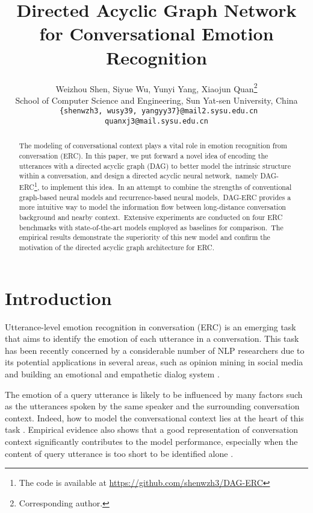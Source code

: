 \documentclass[11pt,a4paper]{article}
\title{Directed Acyclic Graph Network for Conversational Emotion Recognition}
\author{Weizhou Shen,  Siyue Wu,  Yunyi Yang, Xiaojun Quan\thanks{\; Corresponding author.} \\
  School of Computer Science and Engineering, Sun Yat-sen University, China \\
  \texttt{ \{shenwzh3, wusy39, yangyy37\}@mail2.sysu.edu.cn}\\
  \texttt{quanxj3@mail.sysu.edu.cn}}
\date{}
\begin{document}
\maketitle
\begin{abstract}
The modeling of conversational context plays a vital role in emotion recognition from conversation (ERC). In this paper, we put forward a novel idea of encoding the utterances with a directed acyclic graph (DAG) to better model the intrinsic structure within a conversation, and design a directed acyclic neural network,~namely DAG-ERC\footnote{The code is available at \url{https://github.com/shenwzh3/DAG-ERC}}, to implement this idea.~In an attempt to combine the strengths of conventional graph-based neural models and recurrence-based neural models,~DAG-ERC provides a more intuitive way to model the information flow between long-distance conversation background and nearby context.~Extensive experiments are conducted on four ERC benchmarks with state-of-the-art models employed as baselines for comparison.~The empirical results demonstrate the superiority of this new model and confirm the motivation of the directed acyclic graph architecture for ERC.

\end{abstract}

\section{Introduction}
Utterance-level emotion recognition in conversation (ERC) is an emerging task that aims to identify the emotion of each utterance in a conversation. This task has been recently concerned by a considerable number of NLP researchers due to its potential applications in several areas, such as opinion mining in social media \citep{chatterjee2019semeval} and building an emotional and empathetic dialog system \citep{majumder2020mime}. 

The emotion of a query utterance is likely to be influenced by many factors such as the utterances spoken by the same speaker and the surrounding conversation context. Indeed, how to model the conversational context lies at the heart of this task \citep{poria2019emotion}. Empirical evidence also shows that a good representation of conversation context significantly contributes to the model performance, especially when the content of query utterance is too short to be identified alone \citep{ghosal2019dialoguegcn}.
\end{document}
